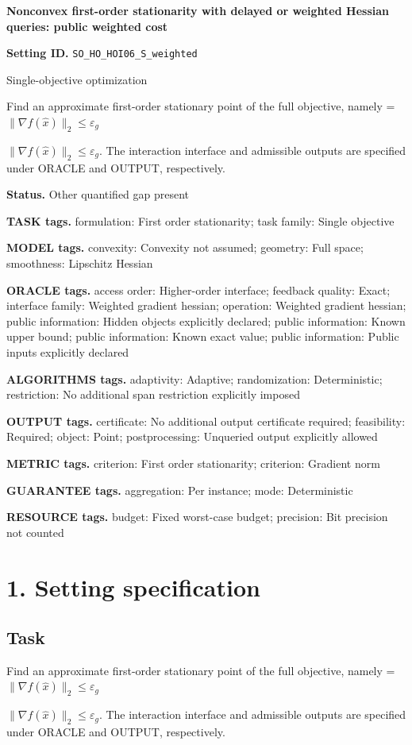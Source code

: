 \documentclass[10pt,a4paper]{article}
\newcommand{\AtlasMath}[1]{\par\begingroup\centering\setbox0=\hbox{$\displaystyle #1$}\ifdim\wd0>1.4\linewidth\typeout{ATLAS WIDE FORMULA: \the\wd0}\fi\ifdim\wd0>\linewidth\resizebox{\linewidth}{!}{\box0}\else\box0\fi\par\endgroup}
\newcommand{\AtlasInlineMath}[1]{\begingroup\setbox0=\hbox{$#1$}\ifdim\wd0>.4\linewidth\endgroup\AtlasMath{#1}\else\endgroup$#1$\fi}
\begin{document}
\raggedright

{\LARGE\bfseries\sffamily\color{AtlasNavy} Nonconvex first-order stationarity with delayed or weighted Hessian queries: public weighted cost\par}\vspace{5pt}
\textbf{Setting ID.} \texttt{SO\_\allowbreak{}HO\_\allowbreak{}HOI06\_\allowbreak{}S\_\allowbreak{}weighted}

Single-objective optimization

Find an approximate first-order stationary point of the full objective, namely \AtlasInlineMath{\|\nabla f(\widehat{x})\|_2\le\varepsilon_g}. The interaction interface and admissible outputs are specified under ORACLE and OUTPUT, respectively.

\textbf{Status.} Other quantified gap present

\textbf{TASK tags.} formulation: First order stationarity; task family: Single objective

\textbf{MODEL tags.} convexity: Convexity not assumed; geometry: Full space; smoothness: Lipschitz Hessian

\textbf{ORACLE tags.} access order: Higher-order interface; feedback quality: Exact; interface family: Weighted gradient hessian; operation: Weighted gradient hessian; public information: Hidden objects explicitly declared; public information: Known upper bound; public information: Known exact value; public information: Public inputs explicitly declared

\textbf{ALGORITHMS tags.} adaptivity: Adaptive; randomization: Deterministic; restriction: No additional span restriction explicitly imposed

\textbf{OUTPUT tags.} certificate: No additional output certificate required; feasibility: Required; object: Point; postprocessing: Unqueried output explicitly allowed

\textbf{METRIC tags.} criterion: First order stationarity; criterion: Gradient norm

\textbf{GUARANTEE tags.} aggregation: Per instance; mode: Deterministic

\textbf{RESOURCE tags.} budget: Fixed worst-case budget; precision: Bit precision not counted

\section{1. Setting specification}
\subsection{Task}
Find an approximate first-order stationary point of the full objective, namely \AtlasInlineMath{\|\nabla f(\widehat{x})\|_2\le\varepsilon_g}. The interaction interface and admissible outputs are specified under ORACLE and OUTPUT, respectively.
\end{document}
